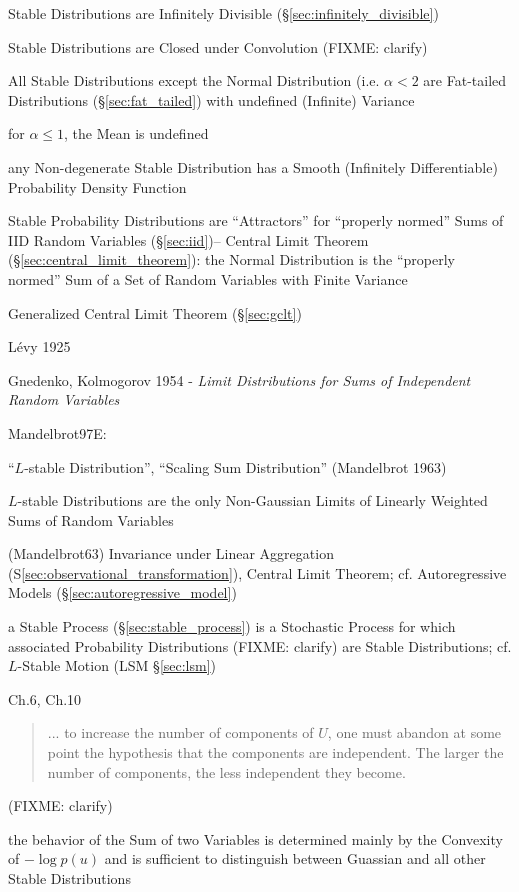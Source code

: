 Stable Distributions are Infinitely Divisible (\S\ref{sec:infinitely_divisible})

Stable Distributions are Closed under Convolution (FIXME: clarify)

All Stable Distributions except the Normal Distribution (i.e. $\alpha < 2$ are
Fat-tailed Distributions (\S\ref{sec:fat_tailed}) with undefined (Infinite)
Variance

for $\alpha \leq 1$, the Mean is undefined

any Non-degenerate Stable Distribution has a Smooth (Infinitely Differentiable)
Probability Density Function

Stable Probability Distributions are ``Attractors'' for ``properly normed'' Sums
of IID Random Variables (\S\ref{sec:iid})-- Central Limit Theorem
(\S\ref{sec:central_limit_theorem}): the Normal Distribution is the ``properly
normed'' Sum of a Set of Random Variables with Finite Variance

Generalized Central Limit Theorem (\S\ref{sec:gclt})

L\'evy 1925

Gnedenko, Kolmogorov 1954 - \emph{Limit Distributions for Sums of Independent
Random Variables}

Mandelbrot97E:

``$L$-stable Distribution'', ``Scaling Sum Distribution'' (Mandelbrot 1963)

$L$-stable Distributions are the only Non-Gaussian Limits of Linearly Weighted
Sums of Random Variables

(Mandelbrot63) Invariance under Linear Aggregation
(S\ref{sec:observational_transformation}), Central Limit Theorem; cf.
Autoregressive Models (\S\ref{sec:autoregressive_model})

a Stable Process (\S\ref{sec:stable_process}) is a Stochastic Process for which
associated Probability Distributions (FIXME: clarify) are Stable Distributions;
cf. $L$-Stable Motion (LSM \S\ref{sec:lsm})

Ch.6, Ch.10

\begin{quote}
  ... to increase the number of components of $U$, one must abandon at some
  point the hypothesis that the components are independent. The larger the
  number of components, the less independent they become.
\end{quote}
(FIXME: clarify)

the behavior of the Sum of two Variables is determined mainly by the Convexity
of $-\log p(u)$ and is sufficient to distinguish between Guassian and all other
Stable Distributions

